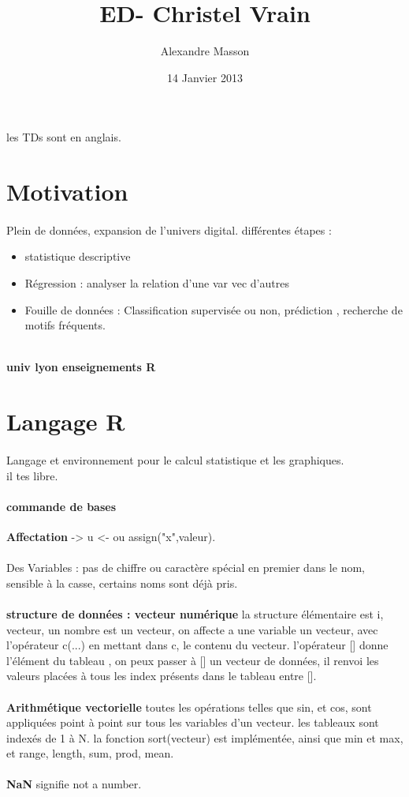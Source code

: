 \documentclass{article}
\title{ED- Christel Vrain}
\author{Alexandre Masson}
\date{14 Janvier 2013}
\begin{document}
\maketitle
\newpage
\tableofcontents
\newpage
\paragraph{} les TDs sont en anglais.
\section{Motivation}
\paragraph{}Plein de données, expansion de l'univers digital. différentes étapes : 
\begin{itemize}
\item statistique descriptive
\item Régression : analyser la relation d'une var vec d'autres
\item Fouille de données : Classification supervisée ou non, prédiction , recherche de motifs fréquents.\\\\
\end{itemize}
\textbf{univ lyon enseignements R}
\newpage
\section{Langage R}
\paragraph{} Langage et environnement pour le calcul statistique et les graphiques.\\ il tes libre.

\paragraph{commande de bases}
\textbf{Affectation} -> u <- ou assign("x",valeur).\\\\Des Variables : pas de chiffre ou caractère spécial en premier dans le nom, sensible à la casse, certains noms sont déjà pris.\\\\\textbf{structure de données : vecteur numérique} la structure élémentaire est i, vecteur, un nombre est un vecteur, on affecte a une variable un vecteur, avec l'opérateur c(...) en mettant dans c, le contenu du vecteur. l'opérateur [] donne l'élément du tableau , on peux passer  à [] un vecteur de données, il renvoi les valeurs placées à tous les index présents dans le tableau entre [].\\\\\textbf{Arithmétique vectorielle} toutes les opérations telles que sin, et cos, sont appliquées point à point sur tous les variables d'un vecteur. les tableaux sont indexés de 1 à N. la fonction sort(vecteur) est implémentée, ainsi que min et max, et range, length, sum, prod, mean.\\\\\textbf{NaN}  signifie not a number.
\end{document}
